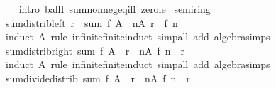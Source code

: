 \begin{isabellebody}
%
\isadelimproof
\ \ %
\endisadelimproof
%
\isatagproof
{}\isamarkupfalse%
\ {\isacharparenleft}{\kern0pt}intro\ ballI\ sum{\isacharunderscore}{\kern0pt}nonneg{\isacharunderscore}{\kern0pt}eq{\isacharunderscore}{\kern0pt}{}{\isacharunderscore}{\kern0pt}iff\ zero{\isacharunderscore}{\kern0pt}le{\isacharparenright}{\kern0pt}%
\endisatagproof
{\isafoldproof}%
%
\isadelimproof
\isanewline
%
\endisadelimproof
\isanewline
{}\isamarkupfalse%
\ semiring{\isacharunderscore}{\kern0pt}{}\isanewline
{}\isanewline
\isanewline
{}\isamarkupfalse%
\ sum{\isacharunderscore}{\kern0pt}distrib{\isacharunderscore}{\kern0pt}left{\isacharcolon}{\kern0pt}\ {\isachardoublequoteopen}r\ {\isacharasterisk}{\kern0pt}\ sum\ f\ A\ {\isacharequal}{\kern0pt}\ {\isacharparenleft}{\kern0pt}{\isasymSum}n{\isasymin}A{\isachardot}{\kern0pt}\ r\ {\isacharasterisk}{\kern0pt}\ f\ n{\isacharparenright}{\kern0pt}{\isachardoublequoteclose}\isanewline
%
\isadelimproof
\ \ %
\endisadelimproof
%
\isatagproof
{}\isamarkupfalse%
\ {\isacharparenleft}{\kern0pt}induct\ A\ rule{\isacharcolon}{\kern0pt}\ infinite{\isacharunderscore}{\kern0pt}finite{\isacharunderscore}{\kern0pt}induct{\isacharparenright}{\kern0pt}\ {\isacharparenleft}{\kern0pt}simp{\isacharunderscore}{\kern0pt}all\ add{\isacharcolon}{\kern0pt}\ algebra{\isacharunderscore}{\kern0pt}simps{\isacharparenright}{\kern0pt}%
\endisatagproof
{\isafoldproof}%
%
\isadelimproof
\isanewline
%
\endisadelimproof
\isanewline
{}\isamarkupfalse%
\ sum{\isacharunderscore}{\kern0pt}distrib{\isacharunderscore}{\kern0pt}right{\isacharcolon}{\kern0pt}\ {\isachardoublequoteopen}sum\ f\ A\ {\isacharasterisk}{\kern0pt}\ r\ {\isacharequal}{\kern0pt}\ {\isacharparenleft}{\kern0pt}{\isasymSum}n{\isasymin}A{\isachardot}{\kern0pt}\ f\ n\ {\isacharasterisk}{\kern0pt}\ r{\isacharparenright}{\kern0pt}{\isachardoublequoteclose}\isanewline
%
\isadelimproof
\ \ %
\endisadelimproof
%
\isatagproof
{}\isamarkupfalse%
\ {\isacharparenleft}{\kern0pt}induct\ A\ rule{\isacharcolon}{\kern0pt}\ infinite{\isacharunderscore}{\kern0pt}finite{\isacharunderscore}{\kern0pt}induct{\isacharparenright}{\kern0pt}\ {\isacharparenleft}{\kern0pt}simp{\isacharunderscore}{\kern0pt}all\ add{\isacharcolon}{\kern0pt}\ algebra{\isacharunderscore}{\kern0pt}simps{\isacharparenright}{\kern0pt}%
\endisatagproof
{\isafoldproof}%
%
\isadelimproof
\isanewline
%
\endisadelimproof
\isanewline
{}\isamarkupfalse%
\isanewline
\isanewline
{}\isamarkupfalse%
\ sum{\isacharunderscore}{\kern0pt}divide{\isacharunderscore}{\kern0pt}distrib{\isacharcolon}{\kern0pt}\ {\isachardoublequoteopen}sum\ f\ A\ {\isacharslash}{\kern0pt}\ r\ {\isacharequal}{\kern0pt}\ {\isacharparenleft}{\kern0pt}{\isasymSum}n{\isasymin}A{\isachardot}{\kern0pt}\ f\ n\ {\isacharslash}{\kern0pt}\ r{\isacharparenright}{\kern0pt}{\isachardoublequoteclose}\isanewline

\end{isabellebody}
